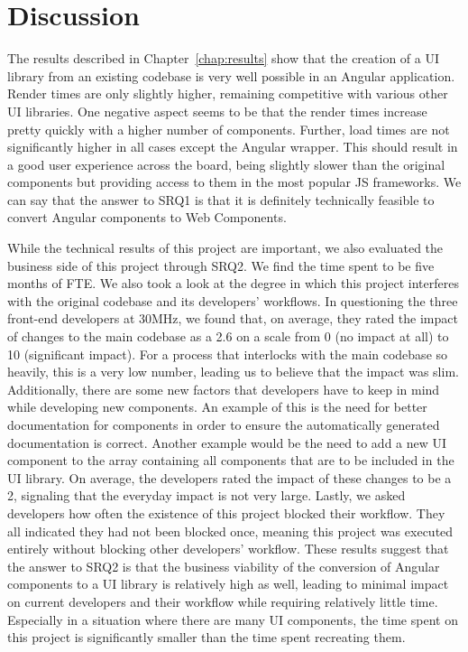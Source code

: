 \chapter{Discussion}\label{chap:discussion}

The results described in Chapter~\ref{chap:results} show that the creation of a UI library from an existing codebase is very well possible in an Angular application. Render times are only slightly higher, remaining competitive with various other UI libraries. One negative aspect seems to be that the render times increase pretty quickly with a higher number of components. Further, load times are not significantly higher in all cases except the Angular wrapper. This should result in a good user experience across the board, being slightly slower than the original components but providing access to them in the most popular JS frameworks. We can say that the answer to SRQ1 is that it is definitely technically feasible to convert Angular components to Web Components.

While the technical results of this project are important, we also evaluated the business side of this project through SRQ2. We find the time spent to be five months of FTE\@. We also took a look at the degree in which this project interferes with the original codebase and its developers' workflows. In questioning the three front-end developers at 30MHz, we found that, on average, they rated the impact of changes to the main codebase as a 2.6 on a scale from 0 (no impact at all) to 10 (significant impact). For a process that interlocks with the main codebase so heavily, this is a very low number, leading us to believe that the impact was slim.
Additionally, there are some new factors that developers have to keep in mind while developing new components. An example of this is the need for better documentation for components in order to ensure the automatically generated documentation is correct. Another example would be the need to add a new UI component to the array containing all components that are to be included in the UI library. On average, the developers rated the impact of these changes to be a 2, signaling that the everyday impact is not very large. Lastly, we asked developers how often the existence of this project blocked their workflow. They all indicated they had not been blocked once, meaning this project was executed entirely without blocking other developers' workflow. These results suggest that the answer to SRQ2 is that the business viability of the conversion of Angular components to a UI library is relatively high as well, leading to minimal impact on current developers and their workflow while requiring relatively little time. Especially in a situation where there are many UI components, the time spent on this project is significantly smaller than the time spent recreating them.

